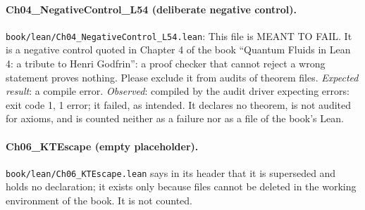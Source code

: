 \paragraph{Ch04\_\allowbreak{}NegativeControl\_\allowbreak{}L54 (deliberate negative control).} {\footnotesize\raggedright\texttt{book/lean/Ch04\_\allowbreak{}NegativeControl\_\allowbreak{}L54.\allowbreak{}lean}: This file is MEANT TO FAIL.\allowbreak{} It is a negative control quoted in Chapter 4 of the book “Quantum Fluids in Lean 4: a tribute to Henri Godfrin”: a proof checker that cannot reject a wrong statement proves nothing.\allowbreak{} Please exclude it from audits of theorem files.\allowbreak{} \emph{Expected result}: a compile error. \emph{Observed}: compiled by the audit driver expecting errors: exit code 1, 1 error; it failed, as intended. It declares no theorem, is not audited for axioms, and is counted neither as a failure nor as a file of the book's Lean.\par}
\paragraph{Ch06\_\allowbreak{}KTEscape (empty placeholder).} {\footnotesize\raggedright\texttt{book/lean/Ch06\_\allowbreak{}KTEscape.\allowbreak{}lean} says in its header that it is superseded and holds no declaration; it exists only because files cannot be deleted in the working environment of the book. It is not counted.\par}

